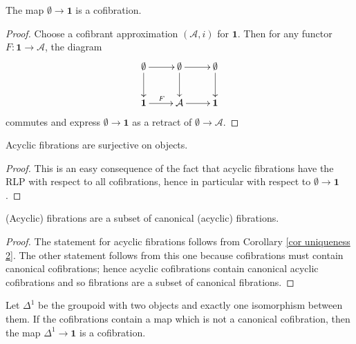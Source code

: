 \begin{lemma} \label{lemma uniqueness 1}
The map $\emptyset \to \mathbf 1$ is a cofibration.
\end{lemma}

\begin{proof}
Choose a cofibrant approximation $(\mathcal A,i)$ for $\mathbf 1$. Then for any functor $F \colon \mathbf 1 \to \mathcal A$, the diagram
\[
\xymatrix{
\emptyset \ar[d] \ar[r] & \emptyset \ar[d] \ar[r] & \emptyset \ar[d] \\
\mathbf 1 \ar[r]^F & \mathcal A \ar[r] & \mathbf 1
}
\]
commutes and express $\emptyset \to \mathbf 1$ as a retract of $\emptyset \to \mathcal A$.
\end{proof}

\begin{cor} \label{cor uniqueness 2}
Acyclic fibrations are surjective on objects.
\end{cor}

\begin{proof}
This is an easy consequence of the fact that acyclic fibrations have the RLP with respect to all cofibrations, hence in particular with respect to $\emptyset \to \mathbf 1$.
\end{proof}

\begin{cor} \label{cor uniqueness 3}
(Acyclic) fibrations are a subset of canonical (acyclic) fibrations.
\end{cor}

\begin{proof}
The statement for acyclic fibrations follows from Corollary \ref{cor uniqueness 2}. The other statement follows from this one because cofibrations must contain canonical cofibrations; hence acyclic cofibrations contain canonical acyclic cofibrations and so fibrations are a subset of canonical fibrations.
\end{proof}

\begin{lemma} \label{lemma uniqueness 4}
Let $\Delta^1$ be the groupoid with two objects and exactly one isomorphism between them. If the cofibrations contain a map which is not a canonical cofibration, then the map $\Delta^1 \to \mathbf 1$ is a cofibration.
\end{lemma}

